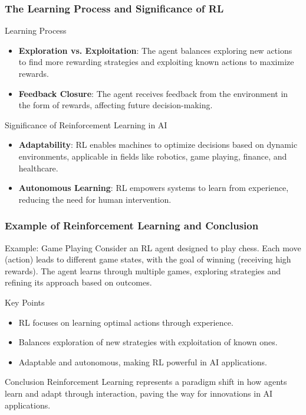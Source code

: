 \documentclass[aspectratio=169]{beamer}
\begin{document}
\begin{frame}[fragile]
    \frametitle{The Learning Process and Significance of RL}

    \begin{block}{Learning Process}
        \begin{itemize}
            \item \textbf{Exploration vs. Exploitation}: The agent balances exploring new actions to find more rewarding strategies and exploiting known actions to maximize rewards.
            \item \textbf{Feedback Closure}: The agent receives feedback from the environment in the form of rewards, affecting future decision-making.
        \end{itemize}
    \end{block}

    \begin{block}{Significance of Reinforcement Learning in AI}
        \begin{itemize}
            \item \textbf{Adaptability}: RL enables machines to optimize decisions based on dynamic environments, applicable in fields like robotics, game playing, finance, and healthcare.
            \item \textbf{Autonomous Learning}: RL empowers systems to learn from experience, reducing the need for human intervention.
        \end{itemize}
    \end{block}
\end{frame}

\begin{frame}[fragile]
    \frametitle{Example of Reinforcement Learning and Conclusion}

    \begin{block}{Example: Game Playing}
        Consider an RL agent designed to play chess. Each move (action) leads to different game states, with the goal of winning (receiving high rewards). The agent learns through multiple games, exploring strategies and refining its approach based on outcomes.
    \end{block}

    \begin{block}{Key Points}
        \begin{itemize}
            \item RL focuses on learning optimal actions through experience.
            \item Balances exploration of new strategies with exploitation of known ones.
            \item Adaptable and autonomous, making RL powerful in AI applications.
        \end{itemize}
    \end{block}

    \begin{block}{Conclusion}
        Reinforcement Learning represents a paradigm shift in how agents learn and adapt through interaction, paving the way for innovations in AI applications.
    \end{block}
\end{frame}
\end{document}
